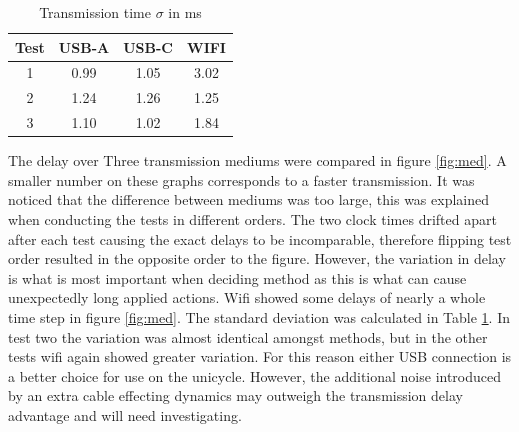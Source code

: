 \documentclass[twoside,twocolumn,12pt]{article}
\begin{document}
\begin{table}[h]
\centering
\begin{tabular}{ c | c | c | c }
Test& USB-A & USB-C & WIFI\\ 
\midrule
1&0.99&1.05 &3.02\\
2&1.24& 1.26&1.25\\
3&1.10&1.02 &1.84\\
\end{tabular}
\caption{Transmission time $\sigma$ in ms}
\label{table:td}
\end{table}
The delay over Three transmission mediums were compared in figure \ref{fig:med}. A smaller number on these graphs corresponds to a faster transmission. It was noticed that the difference between mediums was too large, this was explained when conducting the tests in different orders. The two clock times drifted apart after each test causing the exact delays to be incomparable, therefore flipping test order resulted in the opposite order to the figure. However, the variation in delay is what is most important when deciding method as this is what can cause unexpectedly long applied actions. Wifi showed some delays of nearly a whole time step in figure \ref{fig:med}. The standard deviation was calculated in Table \ref{table:td}. In test two the variation was almost identical amongst methods, but in the other tests wifi again showed greater variation. For this reason either USB connection is a better choice for use on the unicycle. However, the additional noise introduced by an extra cable effecting dynamics  may outweigh the transmission delay advantage and will need investigating. 
\end{document}
